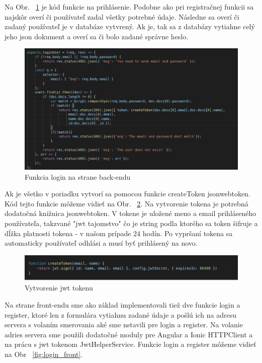 \indent Na Obr. ~\ref{fig:login_back} je kód funkcie na prihlásenie. Podobne ako pri registračnej funkcii sa najskôr overí či používateľ zadal všetky potrebné údaje. Následne sa overí či zadaný používateľ je v databáze vytvrený. Ak je, tak sa z databázy vytiahne celý jeho json dokument a overí sa či bolo zadané správne heslo.

\begin{figure}[H]
    \centering
    \includegraphics[scale=0.40]{img/imp/login_back.png}
    \caption{Funkcia login na strane back-endu}
    \label{fig:login_back}
\end{figure}

\indent Ak je všetko v poriadku vytvorí sa pomocou funkcie createToken jsonwebtoken. Kód tejto funkcie môžeme vidieť na Obr. ~\ref{fig:jwt}. Na vytvorenie tokena je potrebná dodatočná knižnica jsonwebtoken. V tokene je uložené meno a email prihláseného používateľa, takzvané "jwt tajomstvo"  čo je string podla ktorého sa token šifruje a dĺžka platnosti tokena - v našom prípade 24 hodín. Po vypršaní tokena sa automaticky používateľ odhlási a musí byť prihlásený na novo. 

\begin{figure}[H]
    \centering
    \includegraphics[scale=0.42]{img/imp/jwt.png}
    \caption{Vytvorenie jwt tokenu}
    \label{fig:jwt}
\end{figure}

\indent Na strane front-endu sme ako základ implementovali tiež dve funkcie login a register, ktoré len z formulára vytiahnu zadané údaje a pošlú ich na adresu servera s volaním smerovania aké sme nstavili pre login a register. Na volanie adries servera sme použili dodatočné moduly pre Angular a Ionic HTTPClient a na prácu s jwt tokenom JwtHelperService. Funkcie login a register môžeme vidieť na Obr ~\ref{fig:login_front}. 

